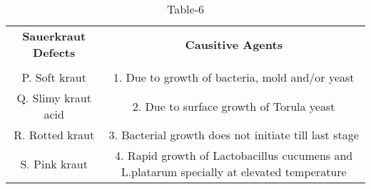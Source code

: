 \begin{table}[htbp]
  \centering
  \caption{Table-6}
  \label{table6}
  \begin{tabular}{cc}
  \textbf{Sauerkraut Defects} & \textbf{Causitive Agents} \\ \\
    P. Soft kraut & 1. Due to growth of bacteria, mold and/or yeast \\
    Q. Slimy kraut acid & 2. Due to surface growth of Torula yeast\\
    R. Rotted kraut & 3. Bacterial growth does not initiate till last stage \\
    S. Pink kraut & 4. Rapid growth of Lactobacillus cucumens and L.platarum specially at elevated temperature \\
  \end{tabular}
\end{table}